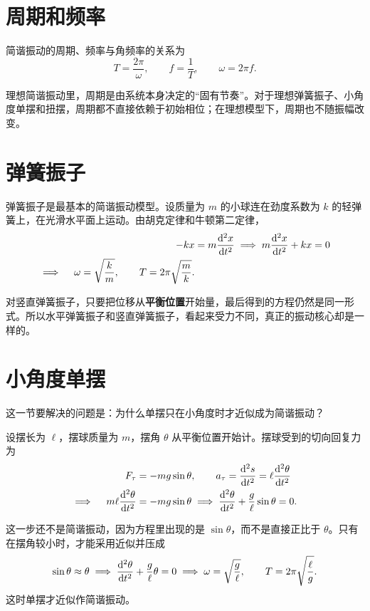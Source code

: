 \documentclass[lang=cn,11pt]{elegantbook}
\begin{document}
\section{周期和频率}

简谐振动的周期、频率与角频率的关系为
\[
T=\frac{2\pi}{\omega},\qquad f=\frac{1}{T},\qquad \omega=2\pi f.
\]

\begin{note}
理想简谐振动里，周期是由系统本身决定的“固有节奏”。对于理想弹簧振子、小角度单摆和扭摆，周期都不直接依赖于初始相位；在理想模型下，周期也不随振幅改变。
\end{note}

\section{弹簧振子}

弹簧振子是最基本的简谐振动模型。设质量为 \(m\) 的小球连在劲度系数为 \(k\) 的轻弹簧上，在光滑水平面上运动。由胡克定律和牛顿第二定律，
\[
\begin{aligned}
-kx&=m\dv[2]{x}{t}
\implies m\dv[2]{x}{t}+kx=0 \\
\implies\quad
\omega=\sqrt{\frac{k}{m}},\qquad
T=2\pi\sqrt{\frac{m}{k}}.
\end{aligned}
\]

\begin{remark}
对竖直弹簧振子，只要把位移从\textbf{平衡位置}开始量，最后得到的方程仍然是同一形式。所以水平弹簧振子和竖直弹簧振子，看起来受力不同，真正的振动核心却是一样的。
\end{remark}

\section{小角度单摆}

这一节要解决的问题是：为什么单摆只在小角度时才近似成为简谐振动？

设摆长为 \(\ell\)，摆球质量为 \(m\)，摆角 \(\theta\) 从平衡位置开始计。摆球受到的切向回复力为
\[
\begin{aligned}
F_{\tau}&=-mg\sin\theta,\qquad
a_{\tau}=\dv[2]{s}{t}=\ell\dv[2]{\theta}{t} \\
\implies\quad
m\ell\dv[2]{\theta}{t}&=-mg\sin\theta
\implies
\dv[2]{\theta}{t}+\frac{g}{\ell}\sin\theta=0.
\end{aligned}
\]

这一步还不是简谐振动，因为方程里出现的是 \(\sin\theta\)，而不是直接正比于 \(\theta\)。只有在摆角较小时，才能采用近似并压成
\[
\sin\theta\approx \theta
\implies
\dv[2]{\theta}{t}+\frac{g}{\ell}\theta=0
\implies
\omega=\sqrt{\frac{g}{\ell}},\qquad
T=2\pi\sqrt{\frac{\ell}{g}}.
\]
这时单摆才近似作简谐振动。
\end{document}
